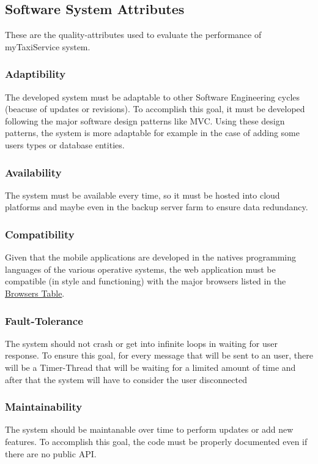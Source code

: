 \subsection{Software System Attributes}
These are the quality-attributes used to evaluate the performance of myTaxiService system.

	\subsubsection{Adaptibility}
	The developed system must be adaptable to other Software Engineering cycles (beacuse of updates or revisions). To accomplish this goal, it must be developed following the major software design patterns like MVC. Using these design patterns, the system is more adaptable for example in the case of adding some users types or database entities.

	\subsubsection{Availability}
	The system must be available every time, so it must be hosted into cloud platforms and maybe even in the backup server farm to ensure data redundancy.

	\subsubsection{Compatibility}
	Given that the mobile applications are developed in the natives programming languages of the various operative systems, the web application must be compatible (in style and functioning) with the major browsers listed in the \hyperref[tab:browsersTable]{Browsers Table}.

	\subsubsection{Fault-Tolerance}
	The system should not crash or get into infinite loops in waiting for user response. To ensure this goal, for every message that will be sent to an user, there will be a Timer-Thread that will be waiting for a limited amount of time and after that the system will have to consider the user disconnected

	\subsubsection{Maintainability}
	The system should be maintanable over time to perform updates or add new features. To accomplish this goal, the code must be properly documented even if there are no public API.

